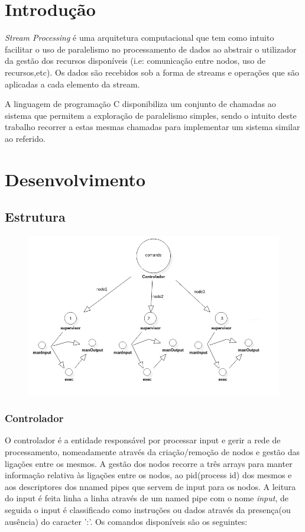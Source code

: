 \documentclass[12pt]{article}
\begin{document}
\section{Introdução}
\textit{Stream Processing} é uma arquitetura computacional que tem como intuito facilitar o uso de paralelismo no processamento de dados ao abstrair o utilizador da gestão dos recursos disponíveis (i.e: comunicação entre nodos, uso de recursos,etc). Os dados são recebidos sob a forma de streams e operações que são aplicadas a cada elemento da stream. 

A linguagem de programação C disponibiliza um conjunto de chamadas ao sistema que permitem a exploração de paralelismo simples, sendo o intuito deste trabalho recorrer a estas mesmas chamadas para implementar um sistema similar ao referido.


\newpage


\section{Desenvolvimento} 

\subsection{Estrutura}
\begin{figure}[ht!]
\centering
\includegraphics[width=120mm]{graph.jpg}
\caption{}
\end{figure}

\subsubsection{Controlador}
O controlador é a entidade responsável por processar input e gerir a rede de processamento, nomeadamente através da criação/remoção de nodos e gestão das ligações entre os mesmos.
A gestão dos nodos recorre a três arrays para manter informação relativa às ligações entre os nodos, ao pid(process id) dos mesmos e aos descriptores dos nnamed pipes que servem de input para os nodos.
A leitura do input é feita linha a linha através de um named pipe com o nome \textit{input}, de seguida o input é classificado como instruções ou dados através da presença(ou ausência) do caracter ':'.
Os comandos disponíveis são os seguintes:
\end{document}
